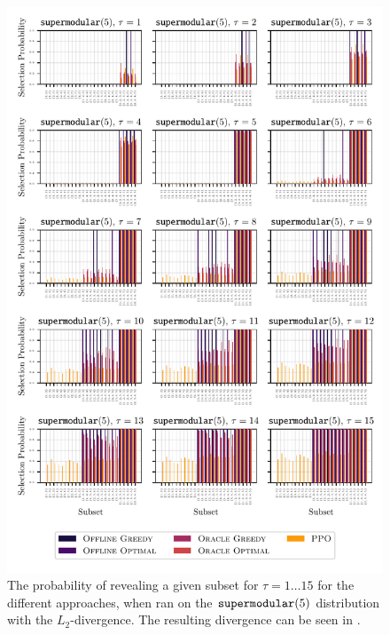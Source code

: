 \begin{figure}[t!]
  \centering
	\includegraphics[width=\textwidth]{figures/l2_norm_convex5_coalition_bars.pdf}
	\caption{ The probability of revealing a given subset for $\tau=1\ldots 15$ for the different approaches, when ran on the $\supermodular[5]$ distribution with the $ L_2 $-divergence.
		The resulting divergence can be seen in .
	}
\end{figure}

